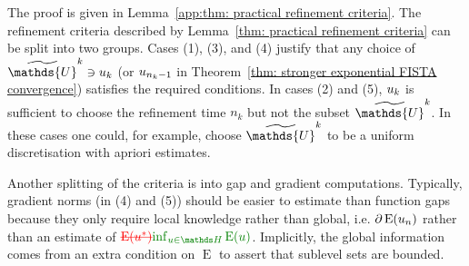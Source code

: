 \documentclass[smallextended]{svjour3}
\let\F\mathds\let\C\mathcal\newcommand{\R}{\F{R}}\newcommand{\A}{\tens{A}}
\newcommand{\op}[1]{\operatorname{#1}}
\newcommand{\1}{\F{1}}
\newcommand{\Emin}[1][\varf0]{\inf_{#1\in\F H}\op{E}(#1)}
\newcommand*{\varf}[1]{%
	\IfEqCase{#1}{%
		{0}{u}%
		{1}{v}%
		{2}{w}%
	}[u#1]%
}
\newcommand*{\spcf}[1]{%
	\IfEqCase{#1}{%
		{0}{\F{U}}%
		{1}{\F{V}}%
		{2}{\F{W}}%
	}[\F{U}#1]%
}
\newcommand{\edit}[2]{{\ifmmode\text{\color{red}\sout{\ensuremath{#1}}}\else {\color{red} \sout{#1}}\fi} {\color{darkgreen} #2}}
\begin{document}
	\noindent The proof is given in Lemma~\ref{app:thm: practical refinement criteria}. The refinement criteria described by Lemma~\ref{thm: practical refinement criteria} can be split into two groups. Cases (1), (3), and (4) justify that any choice of $\tilde{\spcf0}^k\ni\varf0_k$ (or $\varf0_{n_k-1}$ in Theorem~\ref{thm: stronger exponential FISTA convergence}) satisfies the required conditions. In cases (2) and (5), $\varf0_k$ is sufficient to choose the refinement time $n_k$ but not the \edit{subspace}{subset} $\tilde{\spcf0}^k$. In these cases one could, for example, choose $\tilde{\spcf0}^k$ to be a uniform discretisation with apriori estimates.
	
	Another splitting of the criteria is into gap and gradient computations. Typically, gradient norms (in (4) and (5)) should be easier to estimate than function gaps because they only require local knowledge rather than global, i.e. $\partial\op{E}(\varf0_n)$ rather than an estimate of $\edit{\op{E}(\varf0^*)}{\Emin}$. Implicitly, the global information comes from an extra condition on $\op{E}$ to assert that sublevel sets are bounded.
	
\end{document}
